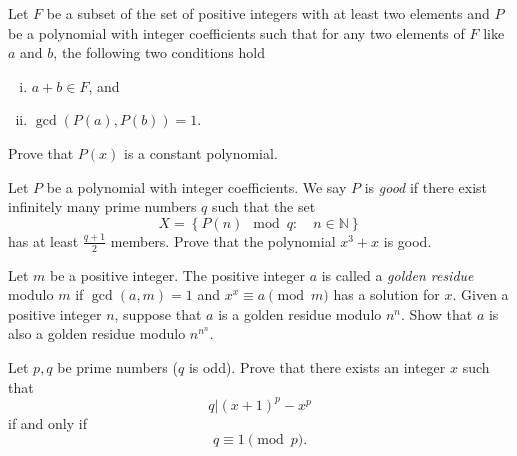 \documentclass[problems.tex]{subfile}
\begin{document}
	
	
	
	\begin{problem}
		Let $F$ be a subset of the set of positive integers with at least two elements and $P$ be a polynomial with integer coefficients such that for any two elements of $F$ like $a$ and $b$, the following two conditions hold
		\begin{enumerate}[(i)]
			\item $a+b \in F$, and
			\item $\gcd(P(a),P(b))=1$.
		\end{enumerate}
		Prove that $P(x)$ is a constant polynomial. %
	\end{problem}
	
	
	
	
	\begin{problem}
		Let $P$ be a polynomial with integer coefficients. We say $P$ is \textit{good} if there exist infinitely many prime numbers $q$ such that the set $$X=\left\{P(n) \mod q : \quad n\in \mathbb N\right\}$$
		has at least $\frac{q+1}{2}$ members. Prove that the polynomial $x^3+x$ is good. %
	\end{problem}
	
	
	
	
	\begin{problem}
		Let $m$ be a positive integer. The positive integer $a$ is called a \textit{golden residue} modulo $m$ if $\gcd(a,m)=1$ and $x^x \equiv a \pmod m$ has a solution for $x$. Given a positive integer $n$, suppose that $a$ is a golden residue modulo $n^n$. Show that $a$ is also a golden residue modulo $n^{n^n}$. %
	\end{problem}
	
	
	
	
	\begin{problem}
		Let $p,q$ be prime numbers ($q$ is odd). Prove that there exists an integer $x$ such that
		$$q |(x+1)^p-x^p$$
		if and only if $$q \equiv 1 \pmod p.$$
	\end{problem}
	
	
	
\end{document}
